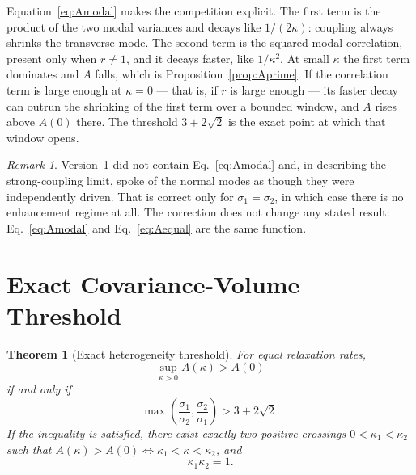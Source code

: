 \documentclass[11pt]{article}
\theoremstyle{plain}
\newtheorem{theorem}{Theorem}
\theoremstyle{remark}
\newtheorem{remark}{Remark}
\begin{document}
Equation~\eqref{eq:Amodal} makes the competition explicit. The first term is the product of the
two modal variances and decays like $1/(2\kappa)$: coupling always shrinks the transverse mode.
The second term is the squared modal correlation, present only when $r\neq1$, and it decays
faster, like $1/\kappa^2$. At small $\kappa$ the first term dominates and $A$ falls, which is
Proposition~\ref{prop:Aprime}. If the correlation term is large enough at $\kappa=0$ --- that
is, if $r$ is large enough --- its faster decay can outrun the shrinking of the first term over
a bounded window, and $A$ rises above $A(0)$ there. The threshold $3+2\sqrt2$ is the exact point
at which that window opens.

\begin{remark}
Version~1 did not contain Eq.~\eqref{eq:Amodal} and, in describing the strong-coupling limit,
spoke of the normal modes as though they were independently driven. That is correct only for
$\sigma_1=\sigma_2$, in which case there is no enhancement regime at all. The correction does
not change any stated result: Eq.~\eqref{eq:Amodal} and Eq.~\eqref{eq:Aequal} are the same
function.
\end{remark}

\section{Exact Covariance-Volume Threshold}\label{sec:volume}

\begin{theorem}[Exact heterogeneity threshold]\label{thm:volume}
For equal relaxation rates,
\begin{equation}
  \sup_{\kappa>0}A(\kappa)>A(0) \label{eq:sup}
\end{equation}
if and only if
\begin{equation}
  \max\!\left(\frac{\sigma_1}{\sigma_2},\frac{\sigma_2}{\sigma_1}\right)>3+2\sqrt2 .
  \label{eq:threshold}
\end{equation}
If the inequality is satisfied, there exist exactly two positive crossings $0<\kappa_1<\kappa_2$
such that $A(\kappa)>A(0)\iff\kappa_1<\kappa<\kappa_2$, and
\begin{equation}
  \kappa_1\kappa_2=1. \label{eq:kk}
\end{equation}
\end{theorem}
\end{document}
